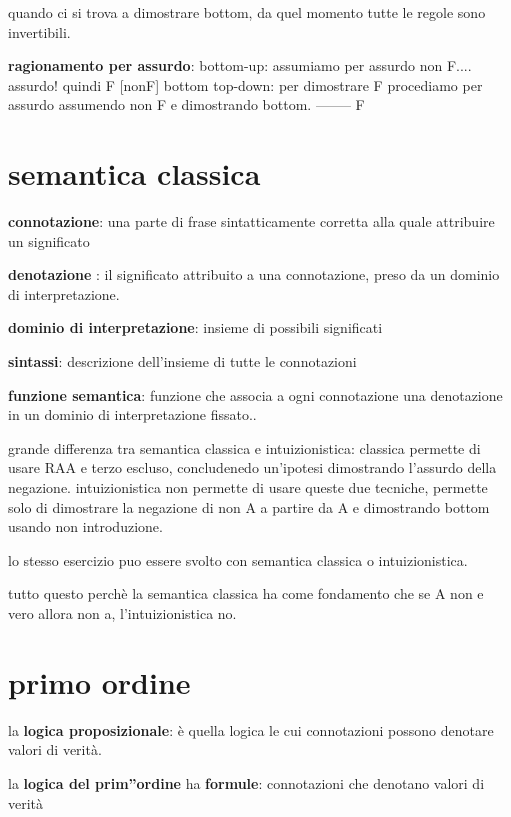 \documentclass[12pt]{article}
\begin{document}
quando ci si trova a dimostrare bottom, da quel momento tutte le regole sono invertibili.

\textbf{ ragionamento per assurdo}: 
bottom-up: assumiamo per assurdo non F.... assurdo! quindi F                                   [nonF]
                                                                                                bottom
top-down: per dimostrare F procediamo per assurdo assumendo non F e dimostrando bottom.          --------
                                                                                                  F
\section{semantica classica}

\textbf{connotazione}: una parte di frase sintatticamente corretta alla quale attribuire un significato

\textbf{denotazione }: il significato attribuito a una connotazione, preso da un dominio di interpretazione.

\textbf{dominio di interpretazione}: insieme di possibili significati

\textbf{sintassi}: descrizione dell'insieme di tutte le connotazioni

\textbf{funzione semantica}: funzione che associa a ogni connotazione una denotazione in un dominio di interpretazione fissato..


grande differenza tra semantica classica e intuizionistica:
classica permette di usare RAA e terzo escluso, concludenedo un'ipotesi dimostrando l'assurdo della negazione.
intuizionistica non permette di usare queste due tecniche, permette solo di dimostrare la negazione di non A a partire da A e dimostrando bottom usando non introduzione.

lo stesso esercizio puo essere svolto con semantica classica o intuizionistica.

tutto questo perchè la semantica classica ha come fondamento che se A non e vero allora non a, l'intuizionistica no.

\section{primo ordine}

la \textbf{logica proposizionale}: è quella logica le cui connotazioni possono denotare valori di  verità.

la \textbf{logica del prim''ordine} ha \textbf{formule}: connotazioni che denotano valori di verità
\end{document}
